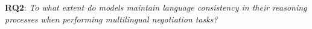 \documentclass[11pt]{article}
\begin{document}




\textbf{RQ2}: \textit{To what extent do models maintain language consistency in their reasoning processes when performing multilingual negotiation tasks?}

\end{document}
